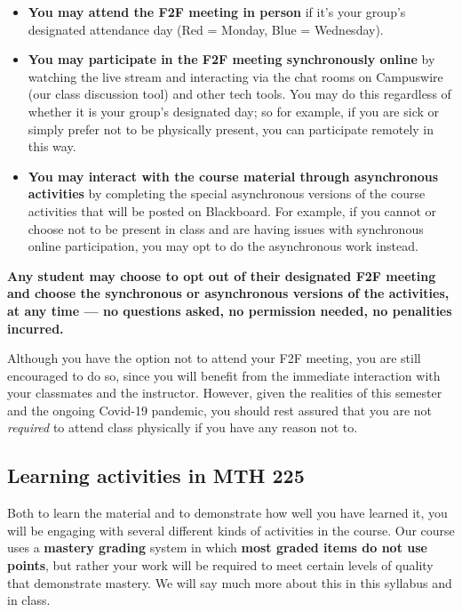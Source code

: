 \documentclass[]{article}
\providecommand{\tightlist}{%
  \setlength{\itemsep}{0pt}\setlength{\parskip}{0pt}}
\begin{document}
\begin{itemize}
\tightlist
\item
  \textbf{You may attend the F2F meeting in person} if it's your group's
  designated attendance day (Red = Monday, Blue = Wednesday).
\item
  \textbf{You may participate in the F2F meeting synchronously online}
  by watching the live stream and interacting via the chat rooms on
  Campuswire (our class discussion tool) and other tech tools. You may
  do this regardless of whether it is your group's designated day; so
  for example, if you are sick or simply prefer not to be physically
  present, you can participate remotely in this way.
\item
  \textbf{You may interact with the course material through asynchronous
  activities} by completing the special asynchronous versions of the
  course activities that will be posted on Blackboard. For example, if
  you cannot or choose not to be present in class and are having issues
  with synchronous online participation, you may opt to do the
  asynchronous work instead.
\end{itemize}

\textbf{Any student may choose to opt out of their designated F2F
meeting and choose the synchronous or asynchronous versions of the
activities, at any time --- no questions asked, no permission needed, no
penalities incurred.}

Although you have the option not to attend your F2F meeting, you are
still encouraged to do so, since you will benefit from the immediate
interaction with your classmates and the instructor. However, given the
realities of this semester and the ongoing Covid-19 pandemic, you should
rest assured that you are not \emph{required} to attend class physically
if you have any reason not to.

\hypertarget{learning-activities-in-mth-225}{%
\subsection{Learning activities in MTH
225}\label{learning-activities-in-mth-225}}

Both to learn the material and to demonstrate how well you have learned
it, you will be engaging with several different kinds of activities in
the course. Our course uses a \textbf{mastery grading} system in which
\textbf{most graded items do not use points}, but rather your work will
be required to meet certain levels of quality that demonstrate mastery.
We will say much more about this in this syllabus and in class.
\end{document}
